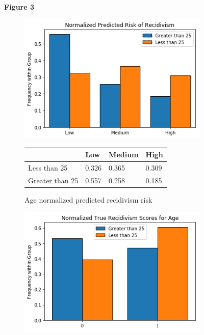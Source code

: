 \documentclass[11pt, fleqn, titlepage]{article}
\begin{document}
	\begin{figure}[H]
	\centering
	\textbf{\textbf{Figure 3}}\par\medskip	
	\begin{subfigure}{0.5\textwidth}
		\centering
		\includegraphics[width=0.9\linewidth]{"imgs/normalized_recid_age"}
		\begin{table}[H]
			\centering
			\begin{tabular}{|l|l|l|l|}
				\hline
				& Low   & Medium & High  \\ \hline
				Less than 25    & 0.326 & 0.365  & 0.309 \\ \hline
				Greater than 25 & 0.557 & 0.258  & 0.185 \\ \hline
			\end{tabular}
		\end{table}
		\caption{Age normalized predicted recidivism risk}	
		\label{fig:predictedrecidage}		
	\end{subfigure}%
	\begin{subfigure}{0.5\textwidth}
		\centering
		\includegraphics[width=0.9\linewidth]{"imgs/true_normalized_age"}

\end{subfigure}
\end{figure}
\end{document}

